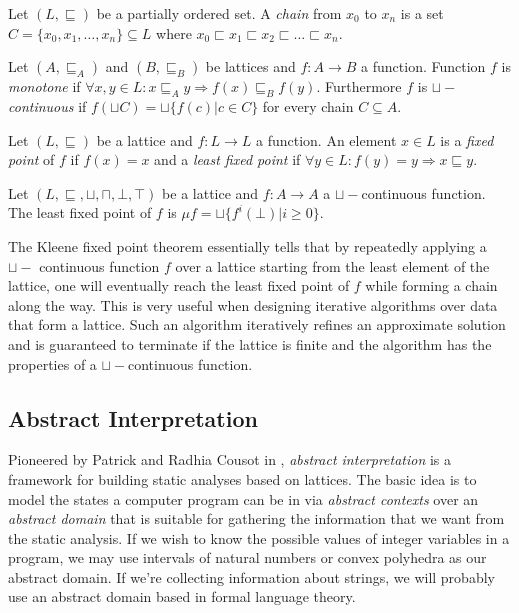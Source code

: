 \begin{defn}
Let $(L, \sqsubseteq)$ be a partially ordered set. A \emph{chain} from $x_0$ to $x_n$ is a set $C = \{x_0, x_1, \dots, x_n\} \subseteq L$ where $x_0 \sqsubset x_1 \sqsubset x_2 \sqsubset \dots \sqsubset x_n$. 
\end{defn}

\begin{defn}
Let $(A, \sqsubseteq_A)$ and $(B, \sqsubseteq_B)$ be lattices and $f: A \rightarrow B$ a function. Function $f$ is \emph{monotone} if $\forall x, y \in L: x \sqsubseteq_A y \Rightarrow f(x) \sqsubseteq_B f(y)$. Furthermore $f$ is \emph{$\sqcup-$continuous} if $f(\sqcup C) = \sqcup\{f(c) | c \in C\}$ for every chain $C \subseteq A$.
\end{defn}

\begin{defn}
Let $(L, \sqsubseteq)$ be a lattice and $f: L \rightarrow L$ a function. An element $x \in L$ is a \emph{fixed point} of $f$ if $f(x) = x$ and a \emph{least fixed point} if $\forall y \in L: f(y) = y \Rightarrow x \sqsubseteq y$.
\end{defn}

\begin{thm}
Let $(L, \sqsubseteq, \sqcup, \sqcap, \bot, \top)$ be a lattice and $f: A \rightarrow A$ a $\sqcup-$continuous function. The least fixed point of $f$ is $\mu f = \sqcup\{f^i(\bot)|i \geq 0\}$.
\end{thm}

The Kleene fixed point theorem essentially tells that by repeatedly applying a $\sqcup-$ continuous function $f$ over a lattice starting from the least element of the lattice, one will eventually reach the least fixed point of $f$ while forming a chain along the way. This is very useful when designing iterative algorithms over data that form a lattice. Such an algorithm iteratively refines an approximate solution and is guaranteed to terminate if the lattice is finite and the algorithm has the properties of a $\sqcup-$continuous function.

\subsection{Abstract Interpretation}
Pioneered by Patrick and Radhia Cousot in \cite{Cousot77}, \emph{abstract interpretation} is a framework for building static analyses based on lattices. The basic idea is to model the states a computer program can be in via \emph{abstract contexts} over an \emph{abstract domain} that is suitable for gathering the information that we want from the static analysis. If we wish to know the possible values of integer variables in a program, we may use intervals of natural numbers or convex polyhedra as our abstract domain. If we're collecting information about strings, we will probably use an abstract domain based in formal language theory.

